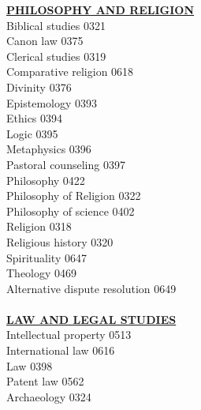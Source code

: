 \documentclass[9pt,twoside]{article}
\newcommand{\categoryheading}[1]{{\fontsize{8}{11}\selectfont \textbf{\uline{#1}}}}
\begin{document}
\begin{multicols}{3}
\categoryheading{PHILOSOPHY AND RELIGION} \\
Biblical studies \hfill 0321 \\
Canon law \hfill 0375 \\
Clerical studies \hfill 0319 \\
Comparative religion \hfill 0618 \\
Divinity \hfill 0376 \\
Epistemology \hfill 0393 \\
Ethics \hfill 0394 \\
Logic \hfill 0395 \\
Metaphysics \hfill 0396 \\
Pastoral counseling \hfill 0397 \\
Philosophy \hfill 0422 \\
Philosophy of Religion \hfill 0322 \\
Philosophy of science \hfill 0402 \\
Religion \hfill 0318 \\
Religious history \hfill 0320 \\
Spirituality \hfill 0647 \\
Theology \hfill 0469 \\
Alternative dispute resolution \hfill 0649 \\
\columnbreak \\
\categoryheading{LAW AND LEGAL STUDIES} \\
Intellectual property \hfill 0513 \\
International law \hfill 0616 \\
Law \hfill 0398 \\
Patent law \hfill 0562 \\
Archaeology \hfill 0324


\end{multicols}
\end{document}
